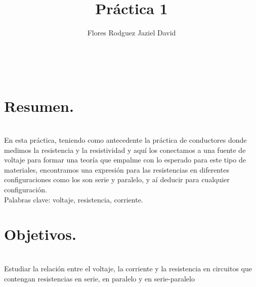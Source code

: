 \documentclass[11pt,a4paper]{article}
\author{Flores Rodguez Jaziel David }
\title{Pr\'{a}ctica 1}
\begin{document}
\tableofcontents
\\
\medskip
\medskip
\section{Resumen.}
\\
En esta pr\'{a}ctica, teniendo como antecedente la pr\'{a}ctica de conductores donde medimos la resistencia y la resistividad y aqu\'{i} los conectamos a una fuente de voltaje para formar una teor\'{i}a que empalme con lo esperado para este tipo de materiales, encontramos una expresi\'{o}n para las resistencias en diferentes configuraciones como los son serie y paralelo, y a\'{i} deducir para cualquier configuraci\'{o}n.
\\
\medskip
Palabras clave: voltaje, resistencia, corriente.


\section{Objetivos.}\\
Estudiar la relaci\'{o}n entre el voltaje, la corriente y la resistencia en circuitos que contengan resistencias en serie, en paralelo y en serie-paralelo
\\
\pagebreak


\end{document}
